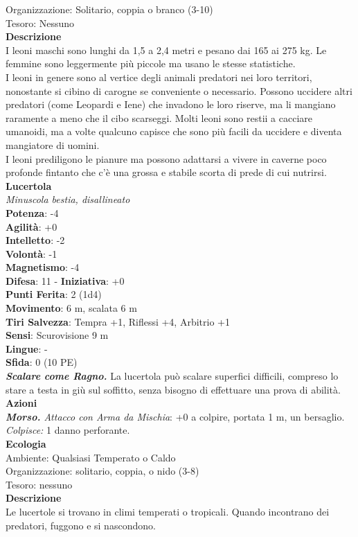 \begin{multicols}{2}
Organizzazione: Solitario, coppia o branco (3-10)\\
Tesoro: Nessuno\\
\textbf{Descrizione}\\
I leoni maschi sono lunghi da 1,5 a 2,4 metri e pesano dai 165 ai 275 kg. Le femmine sono leggermente più piccole ma usano le stesse statistiche.\\
I leoni in genere sono al vertice degli animali predatori nei loro territori, nonostante si cibino di carogne se conveniente o necessario. Possono uccidere altri predatori (come Leopardi e Iene) che invadono le loro riserve, ma li mangiano raramente a meno che il cibo scarseggi. Molti leoni sono restii a cacciare umanoidi, ma a volte qualcuno capisce che sono più facili da uccidere e diventa mangiatore di uomini.\\
I leoni prediligono le pianure ma possono adattarsi a vivere in caverne poco profonde fintanto che c’è una grossa e stabile scorta di prede di cui nutrirsi. \\

\medskip\textbf{Lucertola}\\
\emph{Minuscola bestia, disallineato}\\
\textbf{Potenza}: -4\\
\textbf{Agilità}: +0\\
\textbf{Intelletto}: -2\\
\textbf{Volontà}: -1\\
\textbf{Magnetismo}: -4\\
\textbf{Difesa}: 11 - \textbf{Iniziativa}: +0\\
\textbf{Punti Ferita}: 2 (1d4)\\
\textbf{Movimento}: 6 m, scalata 6 m\\
\textbf{Tiri Salvezza}:  Tempra +1, Riflessi +4, Arbitrio +1 \\
\textbf{Sensi}: Scurovisione 9 m\\
\textbf{Lingue}: -\\
\textbf{Sfida}: 0 (10 PE)\smallskip\\
\emph{\textbf{Scalare come Ragno.}} La lucertola può scalare superfici difficili, compreso lo stare a testa in giù sul soffitto, senza bisogno di effettuare una prova di abilità.\\
\smallskip\textbf{Azioni}\\
\emph{\textbf{Morso.} Attacco con Arma da Mischia}: +0 a colpire, portata 1 m, un bersaglio.\\
\emph{Colpisce:} 1 danno perforante.\\
\textbf{Ecologia}\\
Ambiente: Qualsiasi Temperato o Caldo\\
Organizzazione: solitario, coppia, o nido (3-8)\\
Tesoro: nessuno\\
\textbf{Descrizione}\\
Le lucertole si trovano in climi temperati o tropicali. Quando incontrano dei predatori, fuggono e si nascondono. \\


\end{multicols}
